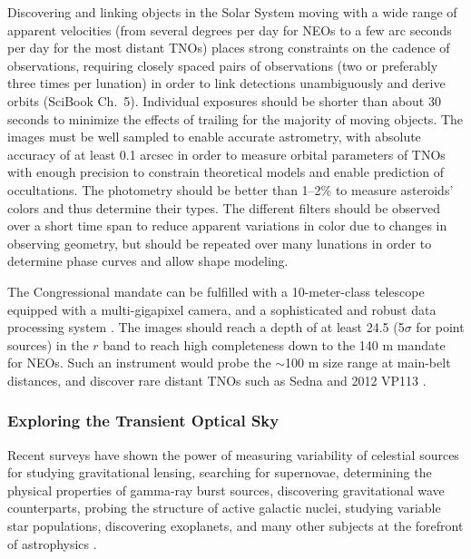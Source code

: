 Discovering and linking objects in the Solar System moving with a wide range of apparent velocities (from
several degrees per day for NEOs to a few arc seconds per day for the most distant TNOs) places strong
constraints on the cadence of observations, requiring closely spaced pairs of observations (two or preferably
three times per lunation) in order to link detections unambiguously and derive orbits (SciBook Ch.~5). Individual
exposures should be shorter than about 30 seconds to minimize the effects of trailing for the majority of
moving objects. The images must be well sampled to enable accurate astrometry, with absolute accuracy of at
least 0.1 arcsec in order to measure orbital parameters of TNOs with enough precision to constrain theoretical
models and enable prediction of occultations. The photometry should be
better than 1--2\% to measure asteroids' colors and thus determine
their types.  The different filters
should be observed over a short time span to reduce apparent
variations in color due to changes in observing geometry, but should
be repeated over many lunations in order to determine phase curves and allow shape modeling.

The Congressional mandate can be fulfilled with a 10-meter-class
telescope equipped with a multi-gigapixel camera, and a sophisticated
and robust data processing system \citep{2007IAUS..236..353I}. The images should reach a depth of at
least 24.5 (5$\sigma$ for point sources) in the $r$ band to reach high
completeness down to the 140 m mandate for NEOs.  Such an instrument
would probe the $\sim$100 m size range at main-belt distances, and
discover rare distant TNOs such as Sedna \citep{2004ApJ...617..645B}
and 2012 VP113 \citep{2014Natur.507..471T}.


\subsubsection{Exploring the Transient Optical Sky}

Recent surveys have shown the power of measuring variability of
celestial sources for
studying gravitational lensing, searching for supernovae, determining
the physical properties of gamma-ray burst sources, discovering
gravitational wave counterparts, probing the structure of active
galactic nuclei, studying variable star populations, discovering
exoplanets, and many other subjects at the forefront of astrophysics
\citep[SciBook Ch.~8;][]{2009PASP..121.1395L,2012IAUS..285..141D,2014ApJ...784...45R}.

